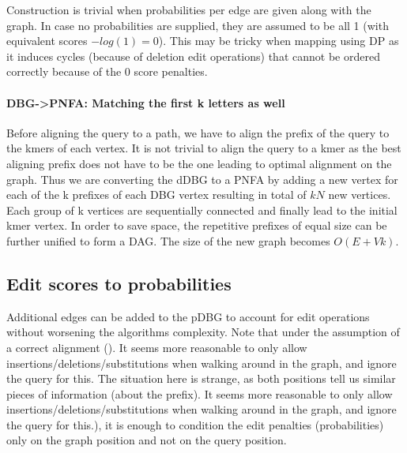 Construction is trivial when probabilities per edge are given along with the graph. In case no probabilities are supplied, they are assumed to be all 1 (with equivalent scores $-log(1)=0$). This may be tricky when mapping using DP as it induces cycles (because of deletion edit operations) that cannot be ordered correctly because of the 0 score penalties.

\paragraph{DBG->PNFA: Matching the first k letters as well}
Before aligning the query to a path, we have to align the prefix of the query to the kmers of each vertex. It is not trivial to align the query to a kmer as the best aligning prefix does not have to be the one leading to optimal alignment on the graph. Thus we are converting the dDBG to a PNFA by adding a new vertex for each of the k prefixes of each DBG vertex resulting in total of $kN$ new vertices. Each group of k vertices are sequentially connected and finally lead to the initial kmer vertex. In order to save space, the repetitive prefixes of equal size can be further unified to form a DAG. The size of the new graph becomes $O(E+Vk)$.

\subsection{Edit scores to probabilities}
Additional edges can be added to the pDBG to account for edit operations without worsening the algorithms complexity. Note that under the assumption of a correct alignment (). It seems more reasonable to only allow insertions/deletions/substitutions when walking around in the graph, and ignore the query for this. The situation here is strange, as both positions tell us similar pieces of information (about the prefix). It seems more reasonable to only allow insertions/deletions/substitutions when walking around in the graph, and ignore the query for this.), it is enough to condition the edit penalties (probabilities) only on the graph position and not on the query position.

